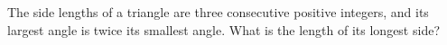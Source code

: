 The side lengths of a triangle are three consecutive positive integers, and its largest angle is twice its smallest angle. What is the length of its longest side?
